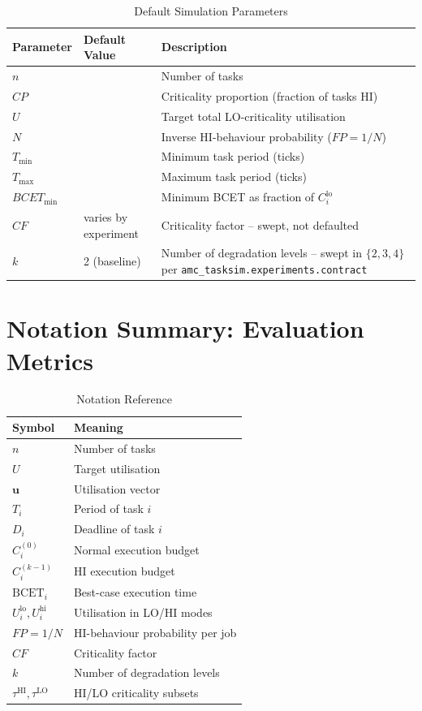 \begin{table}[h]
\centering
\caption{Default Simulation Parameters}
\begin{tabular}{lll}
\toprule
Parameter & Default Value & Description \\
\midrule
$n$ & {} & Number of tasks \\
$CP$ & {} & Criticality proportion (fraction of tasks HI) \\
$U$ & {} & Target total LO-criticality utilisation \\
$N$ & {} & Inverse HI-behaviour probability ($FP = 1/N$) \\
$T_{\min}$ & {} & Minimum task period (ticks) \\
$T_{\max}$ & {} & Maximum task period (ticks) \\
$BCET_{\mathrm{min}}$ & {} & Minimum BCET as fraction of $C_i^{\mathrm{lo}}$ \\
\midrule
$CF$ & varies by experiment & Criticality factor -- swept, not defaulted \\
$k$ & 2 (baseline) & Number of degradation levels -- swept in $\{2,3,4\}$ per \texttt{amc\_tasksim.experiments.contract} \\
\bottomrule
\end{tabular}
\end{table}

\section{Notation Summary: Evaluation Metrics}
\label{sec:notation-eval}

\begin{table}[h]
\centering
\caption{Notation Reference}
\begin{tabular}{ll}
\toprule
Symbol & Meaning \\
\midrule
$n$ & Number of tasks \\
$U$ & Target utilisation \\
$\mathbf{u}$ & Utilisation vector \\
$T_i$ & Period of task $i$ \\
$D_i$ & Deadline of task $i$ \\
$C_i^{(0)}$ & Normal execution budget \\
$C_i^{(k-1)}$ & HI execution budget \\
$\mathrm{BCET}_i$ & Best-case execution time \\
$U_i^{\mathrm{lo}}, U_i^{\mathrm{hi}}$ & Utilisation in LO/HI modes \\
$FP = 1/N$ & HI-behaviour probability per job \\
$CF$ & Criticality factor \\
$k$ & Number of degradation levels \\
$\tau^{\mathrm{HI}}, \tau^{\mathrm{LO}}$ & HI/LO criticality subsets \\
\bottomrule
\end{tabular}
\end{table}
